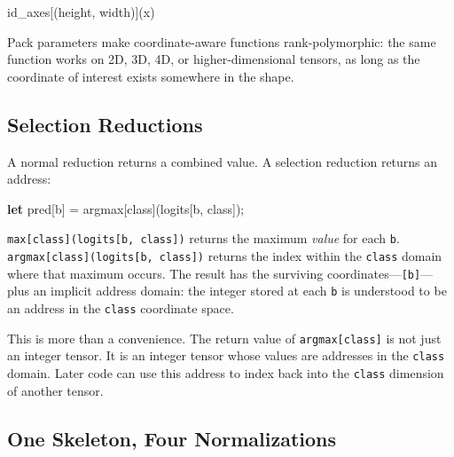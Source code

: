 \documentclass[11pt,titlepage]{article}
\newenvironment{Shaded}{}{}
\newcommand{\KeywordTok}[1]{\textcolor[rgb]{0.00,0.44,0.13}{\textbf{#1}}}
\newcommand{\NormalTok}[1]{#1}
\newcommand{\OperatorTok}[1]{\textcolor[rgb]{0.40,0.40,0.40}{#1}}
\begin{document}
\begin{Shaded}
\begin{Highlighting}[]
\NormalTok{id_axes}\OperatorTok{[}\NormalTok{(height, width)}\OperatorTok{]}\NormalTok{(x)}
\end{Highlighting}
\end{Shaded}

Pack parameters make coordinate-aware functions rank-polymorphic: the
same function works on 2D, 3D, 4D, or higher-dimensional tensors, as
long as the coordinate of interest exists somewhere in the shape.

\vspace{2em}

\hypertarget{selection-reductions}{%
\subsection{Selection Reductions}\label{selection-reductions}}

A normal reduction returns a combined value. A selection reduction
returns an address:

\begin{Shaded}
\begin{Highlighting}[]
\KeywordTok{let}\NormalTok{ pred}\OperatorTok{[}\NormalTok{b}\OperatorTok{]}\NormalTok{ = argmax}\OperatorTok{[}\NormalTok{class}\OperatorTok{]}\NormalTok{(logits}\OperatorTok{[}\NormalTok{b, class}\OperatorTok{]}\NormalTok{);}
\end{Highlighting}
\end{Shaded}

\texttt{max{[}class{]}(logits{[}b,\ class{]})} returns the maximum
\emph{value} for each \texttt{b}.
\texttt{argmax{[}class{]}(logits{[}b,\ class{]})} returns the index
within the \texttt{class} domain where that maximum occurs. The result
has the surviving coordinates---\texttt{{[}b{]}}---plus an implicit
address domain: the integer stored at each \texttt{b} is understood to
be an address in the \texttt{class} coordinate space.

This is more than a convenience. The return value of
\texttt{argmax{[}class{]}} is not just an integer tensor. It is an
integer tensor whose values are addresses in the \texttt{class} domain.
Later code can use this address to index back into the \texttt{class}
dimension of another tensor.

\vspace{2em}

\hypertarget{one-skeleton-four-normalizations}{%
\subsection{One Skeleton, Four
Normalizations}\label{one-skeleton-four-normalizations}}
\end{document}
